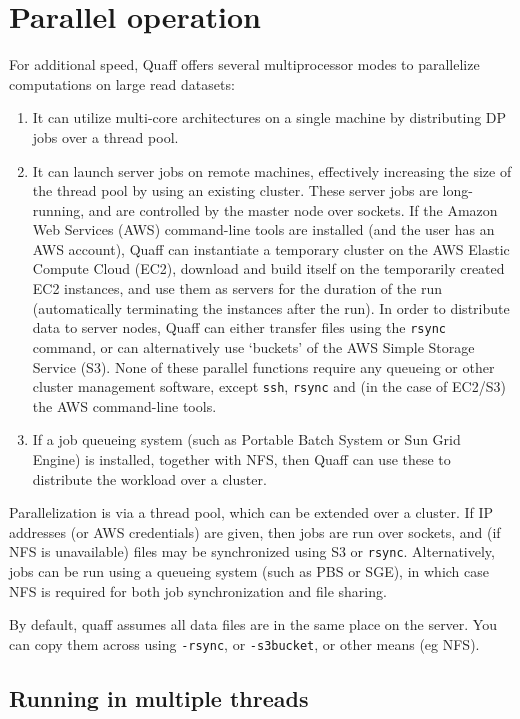 \documentclass{article}
\newcommand\opt[1]{{\tt -#1}}
\begin{document}
\section{Parallel operation}


For additional speed, Quaff offers several multiprocessor modes to parallelize computations on large read datasets:
\begin{enumerate}
\item It can utilize multi-core architectures on a single machine by distributing DP jobs over a thread pool.
\item It can launch server jobs on remote machines, effectively increasing the size of the thread pool by using an existing cluster. These server jobs are long-running, and are controlled by the master node over sockets. If the Amazon Web Services (AWS) command-line tools are installed (and the user has an AWS account), Quaff can instantiate a temporary cluster on the AWS Elastic Compute Cloud (EC2), download and build itself on the temporarily created EC2 instances, and use them as servers for the duration of the run (automatically terminating the instances after the run). In order to distribute data to server nodes, Quaff can either transfer files using the {\tt rsync} command, or can alternatively use `buckets' of the AWS Simple Storage Service (S3). None of these parallel functions require any queueing or other cluster management software, except {\tt ssh}, {\tt rsync} and (in the case of EC2/S3) the AWS command-line tools.
\item If a job queueing system (such as Portable Batch System or Sun Grid Engine) is installed, together with NFS, then Quaff can use these to distribute the workload over a cluster.
\end{enumerate}

Parallelization is via a thread pool, which can be extended over a cluster.
If IP addresses (or AWS credentials) are given, then jobs are run over sockets,
and (if NFS is unavailable) files may be synchronized using S3 or {\tt rsync}.
Alternatively, jobs can be run using a queueing system (such as PBS or SGE),
in which case NFS is required for both job synchronization and file sharing.

By default, quaff assumes all data files are in the same place on the server.
You can copy them across using \opt{rsync}, or \opt{s3bucket}, or other means (eg NFS).

\subsection{Running in multiple threads}
\end{document}

